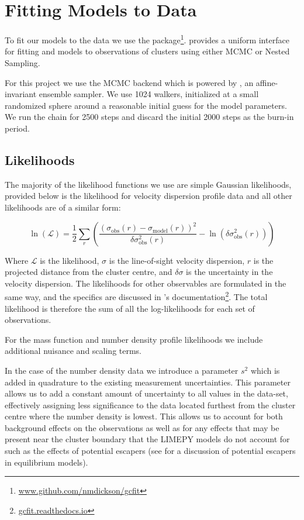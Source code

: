 \section{Fitting Models to Data}


To fit our models to the data we use the 
package\footnote{\url{www.github.com/nmdickson/gcfit}}.  provides a uniform interface
for fitting \evolvemf{} and  models to observations of clusters using either MCMC or
Nested Sampling.

For this project we use the MCMC backend which is powered by 
\citet{Foreman-Mackey2013,Foreman-Mackey2019}, an affine-invariant ensemble  sampler. We use 1024
walkers, initialized at a small randomized sphere around a reasonable initial guess  for the model
parameters. We run the chain for 2500 steps and discard the initial 2000 steps as the burn-in
period.

\subsection{Likelihoods}

The majority of the likelihood functions we use are simple Gaussian likelihoods, provided below is
the likelihood for velocity dispersion profile data and all other likelihoods are of a similar form:

\begin{equation}
    \ln \left(\mathcal{L}\right)=\frac{1}{2}
    \sum_{r}\left(\frac{\left(\sigma_{\mathrm{obs}}(r)
        -\sigma_{\mathrm{model}}(r)\right)^{2}}{\delta \sigma_{\mathrm{obs}}^{2}(r)}
    -\ln \left(\delta \sigma_{\mathrm{obs}}^{2}(r)\right)\right)
\end{equation}

Where $\mathcal{L}$ is the likelihood, $\sigma$ is the line-of-sight velocity dispersion, $r$ is the
projected distance from the cluster centre, and $\delta \sigma$ is the uncertainty in the velocity
dispersion. The likelihoods for other observables are formulated in the same way, and the specifics
are discussed in 's documentation\footnote{\url{gcfit.readthedocs.io}}. The total
likelihood is therefore the sum of all the log-likelihoods for each set of observations.

For the mass function and number density profile likelihoods we include additional nuisance and scaling
terms.

In the case of the number density data we introduce a parameter $s^2$ which is added in quadrature
to the existing measurement uncertainties. This parameter allows us to add a constant amount of
uncertainty to all values in the data-set, effectively assigning less significance to the data
located furthest from the cluster centre where the number density is lowest. This allows us to
account for both background effects on the observations as well as for any effects that may be
present near the cluster boundary that the LIMEPY models do not account for such as the effects of
potential escapers (see \citealt{Claydon2019} for a discussion of potential escapers in equilibrium
models).

